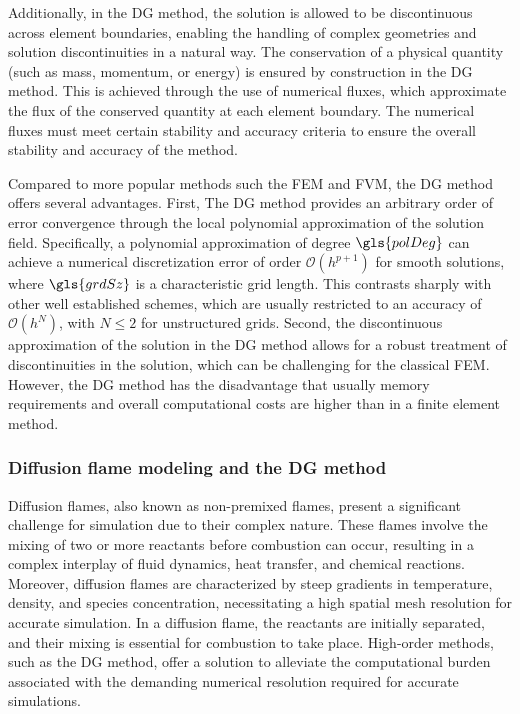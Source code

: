Additionally, in the DG method, the solution is allowed to be discontinuous across element boundaries, enabling the handling of complex geometries and solution discontinuities in a natural way. The conservation of a physical quantity (such as mass, momentum, or energy)  is ensured by construction in the DG method. This is achieved through the use of numerical fluxes, which approximate the flux of the conserved quantity at each element boundary. The numerical fluxes must meet certain stability and accuracy criteria to ensure the overall stability and accuracy of the method. 


Compared to more popular methods such the \gls{FEM} and \gls{FVM}, the DG method offers several advantages. First, The DG method provides an arbitrary order of error convergence through the local polynomial approximation of the solution field. Specifically, a polynomial approximation of degree $\gls{polDeg}$ can achieve a numerical discretization error of order $\mathcal{O}(h^{p+1})$ for smooth solutions, where $\gls{grdSz}$ is a characteristic grid length. This contrasts sharply with other well established schemes, which are usually restricted to an accuracy of $\mathcal{O}(h^N)$, with $N \leq 2$ for unstructured grids. Second, the discontinuous approximation of the solution in the DG method allows for a robust treatment of discontinuities in the solution, which can be challenging for the classical \gls{FEM}. However, the DG method has the disadvantage that usually memory requirements  and overall computational costs are higher than in a finite element method.

\subsubsection{Diffusion flame modeling and the \Gls{DG} method}
Diffusion flames, also known as non-premixed flames, present a significant challenge for simulation due to their complex nature. These flames involve the mixing of two or more reactants before combustion can occur, resulting in a complex interplay of fluid dynamics, heat transfer, and chemical reactions. Moreover, diffusion flames are characterized by steep gradients in temperature, density, and species concentration, necessitating a high spatial mesh resolution for accurate simulation. In a diffusion flame, the reactants are initially separated, and their mixing is essential for combustion to take place. High-order methods, such as the DG method, offer a solution to alleviate the computational burden associated with the demanding numerical resolution required for accurate simulations.
 
